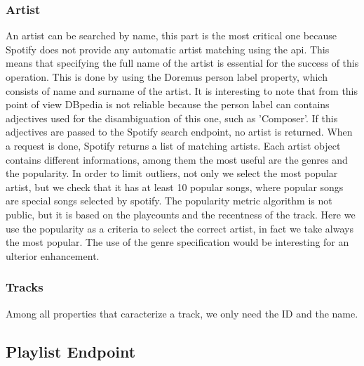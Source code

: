 \subsubsection{Artist}
An artist can be searched by name, this part is the most critical one because Spotify does not provide any automatic artist matching using the api. This means that specifying the full name of the artist is essential for the success of this operation.
This is done by using the Doremus person label property, which consists of name and surname of the artist. It is interesting to note that from this point of view DBpedia is not reliable because the person label can contains adjectives used for the disambiguation of this one, such as 'Composer'. If this adjectives are passed to the Spotify search endpoint, no artist is returned.
When a request is done, Spotify returns a list of matching artists. Each artist object contains different informations, among them the most useful are the genres and the popularity. 
In order to limit outliers, not only we select the most popular artist, but we check that it has at least 10 popular songs, where popular songs are special songs selected by spotify. The popularity metric algorithm is not public, but it is based on the playcounts and the recentness of the track.
Here we use the popularity as a criteria to select the correct artist, in fact we take always the most popular. The use of the genre specification would be interesting for an ulterior enhancement.
\subsubsection{Tracks}
Among all properties that caracterize a track, we only need the ID and the name.

\subsection{Playlist Endpoint}
